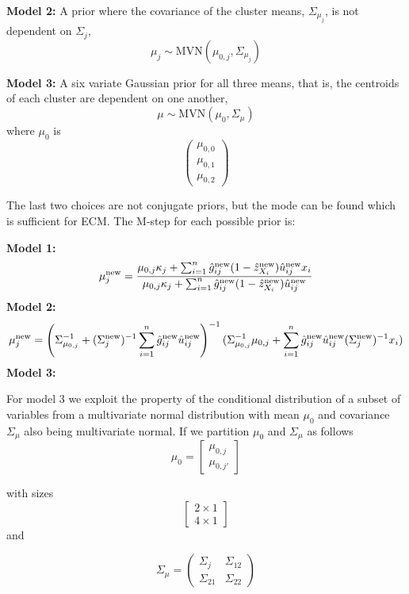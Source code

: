 \textbf{Model 2\label{model2}:} A prior where the covariance of the cluster means, $\Sigma_{\mu_j}$, is not dependent on $\Sigma_j$,
\begin{equation}\label{model2} \mu_j \sim \textrm{MVN}(\mu_{0,j},\Sigma_{\mu_{j}}) \nonumber\end{equation}

\textbf{Model 3\label{model3}:} A six variate Gaussian prior for all three means, that is, the centroids of each cluster are dependent on one another,
\begin{equation}\mu \sim \textrm{MVN}(\mu_0,\Sigma_{\mu})\nonumber\label{model3}\end{equation}
 where $\mu_0$ is
\[ \left( \begin{array}{c}\mu_{0,0}\\\mu_{0,1}\\\mu_{0,2}\end{array}\right)\] 

The last two choices are not conjugate priors, but the mode can be found which is sufficient for ECM.  The M-step for each possible prior is:

\textbf{Model 1\label{model1}:}
$$\mu_j^\textrm{new} = \frac{\mu_{0,j}\kappa_j + \sum_{i=1}^n\hat{g}^\textrm{new}_{ij}(1-\hat{z}^\textrm{new}_{X_i})\hat{u}^\textrm{new}_{ij}x_i}{\mu_{0,j}\kappa_j + \sum_{i=1}^n\hat{g}^\textrm{new}_{ij}(1-\hat{z}^\textrm{new}_{X_i})\hat{u}^\textrm{new}_{ij}}$$
\textbf{Model 2\label{model2}:} 
$$\mu_j^{\textrm{new}} = \left( \Sigma_{\mu_{0,j}}^{-1} + (\Sigma_j^\textrm{new})^{-1}\sum_{i=1}^n\hat{g}^\textrm{new}_{ij}\hat{u}^\textrm{new}_{ij}\right)^{-1}(\Sigma_{\mu_{0,j}}^{-1}\mu_{0,j} + \sum_{i=1}^n\hat{g}^\textrm{new}_{ij}\hat{u}^\textrm{new}_{ij}(\Sigma_j^\textrm{new})^{-1}x_i)$$
\textbf{Model 3\label{model3}:} 

For model 3 we exploit the property of the conditional distribution of a subset of variables from a multivariate normal distribution with mean $\mu_0$ and covariance $\Sigma_\mu$ also being multivariate normal.
If we partition $\mu_0$ and $\Sigma_\mu$ as follows
\[\mu_0 = \left[ \begin{array}{ccc}\mu_{0,j}\\\mu_{0,j'}\end{array}\right]\]

with sizes \[ \left[ \begin{array}{c} 2 \times 1\\4 \times 1 \end{array} \right] \] and

\[\Sigma_\mu = \left( \begin{array}{cc} \Sigma_j & \Sigma_{12}\\\Sigma_{21} & \Sigma_{22} \end{array}\right)\]

